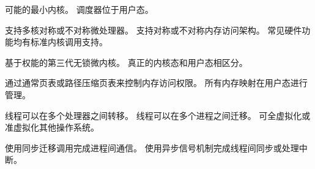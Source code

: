 \begin{description}[leftmargin=0pt,labelindent=0pt,style=nextline,itemsep=8pt]
    \item[\textsf{\color{rmepurple}最小化的高效内核}]
    可能的最小内核。
    调度器位于用户态。

    \item[\textsf{\color{rmepurple}全面的体系架构支持}]
    支持多核对称或不对称微处理器。
    支持对称或不对称内存访问架构。
    常见硬件功能均有标准内核调用支持。

    \item[\textsf{\color{rmepurple}完善的权限管理}]
    基于权能的第三代无锁微内核。
    真正的内核态和用户态相区分。

    \item[\textsf{\color{rmepurple}灵活的内存管理}]
    通过通常页表或路径压缩页表来控制内存访问权限。
    所有内存映射在用户态进行管理。

    \item[\textsf{\color{rmepurple}完善的线程模型和进程模型}]
    线程可以在多个处理器之间转移。
    线程可以在多个进程之间迁移。
    可全虚拟化或准虚拟化其他操作系统。

    \item[\textsf{\color{rmepurple}完善的同步和异步通信机制}]
    使用同步迁移调用完成进程间通信。
    使用异步信号机制完成线程间同步或处理中断。
\end{description}

\newcommand{\RMERevisionHistory}{%
\chapter*{版本历史}
\addcontentsline{toc}{chapter}{版本历史}
\markboth{版本历史}{}

\begin{table}[htbp]
    \centering
    \renewcommand{\arraystretch}{1.25}
    \small
    \begin{tabularx}{\textwidth}{@{}>{\sffamily\bfseries\color{rmepurple}}m{1.8cm}
                                  >{\raggedright\arraybackslash}m{3.2cm}X@{}}
    \toprule
    版本 & 日期（年-月-日） & 说明 \\
    \midrule
    R1T1 & 2017-07-12 & 初始发布。 \\
    R2T1 & 2017-12-02 & 增加了移植说明。 \\
    R3T1 & 2018-06-04 & 增加了附录。 \\
    R3T2 & 2018-08-17 & 增加了内核调用说明，并更新手册以反映内核的更改。 \\
    R3T3 & 2019-09-17 & 修正若干位置，并对接收线程的调度器事件略作修改。 \\
    R4T1 & 2024-09-10 & 发布 R4T1 技术参考手册。 \\
    \bottomrule
    \end{tabularx}
\end{table}
}
